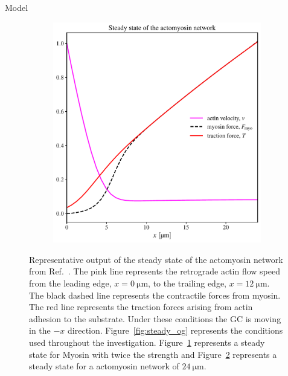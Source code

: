 \documentclass{beamer}
\newlength{\colwidth}
\begin{document}
\begin{frame}[t]
\begin{columns}[t]
\begin{column}{\colwidth}
\begin{block}{Model}
\begin{figure}
\begin{subfigure}{0.3\textwidth}
    \caption{\label{fig:steady_highF}}
    \end{subfigure}%
    \hfill
    \begin{subfigure}{0.3\textwidth}
    \centering
    \includegraphics[width=\linewidth]{../.figures/steady_state_og_longL.pdf}
    \caption{\label{fig:steady_longL}}
    \end{subfigure}
    \caption{\label{fig:sim_steady}
    Representative output of the steady state of the actomyosin network from Ref.~\cite{craig_membrane_2012}. The pink line represents the retrograde actin flow speed from the leading edge, \(x=\qty{0}{\micro\meter}\), to the trailing edge, \(x=\qty{12}{\micro\meter}\). The black dashed line represents the contractile forces from myosin. The red line represents the traction forces arising from actin adhesion to the substrate. Under these conditions the GC is moving in the \(-x\) direction. Figure~\ref{fig:steady_og} represents the conditions used throughout the investigation. Figure~\ref{fig:steady_highF} represents a steady state for Myosin with twice the strength and Figure~\ref{fig:steady_longL} represents a steady state for a actomyosin network of \(\qty{24}{\micro\meter}\).
    }
\end{figure}


\end{block}
\end{column}
\end{columns}
\end{frame}
\end{document}
